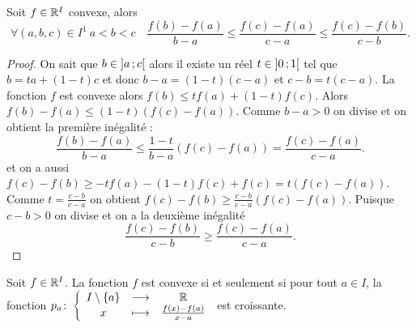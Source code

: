 \begin{theo}\label{theo:pentes}
  Soit \(f \in \mathbb{R}^I\) convexe, alors
  \begin{equation}
    \forall (a,b,c) \in I^1 \ a<b<c \quad \frac{f(b)-f(a)}{b-a} \leqslant 
    \frac{f(c)-f(a)}{c-a} \leqslant \frac{f(c)-f(b)}{c-b}.
  \end{equation}
\end{theo}
\begin{proof}
  On sait que \(b \in \left] a \, ; {} c \right[\) alors il existe un réel \(t \in 
  \left] 0 \, ; {} 1 \right[\) tel que \(b=ta+(1-t)c\) et donc \(b-a=(1-t)(c-a)\) et 
  \(c-b=t(c-a)\). La fonction \(f\) est convexe alors \(f(b) \leqslant 
  tf(a)+(1-t)f(c)\). Alors \(f(b)-f(a) \leqslant (1-t)(f(c)-f(a))\). Comme \(b-a 
  >0\) on divise et on obtient la première inégalité :
  \begin{equation}
    \frac{f(b)-f(a)}{b-a} \leqslant 
    \frac{1-t}{b-a}(f(c)-f(a))=\frac{f(c)-f(a)}{c-a}.
  \end{equation}
  et on a aussi \(f(c)-f(b) \geqslant -tf(a)-(1-t)f(c)+f(c) = t(f(c)-f(a))\). 
  Comme \(t=\frac{c-b}{c-a}\) on obtient \(f(c)-f(b) \geqslant 
  \frac{c-b}{c-a}(f(c)-f(a))\). Puisque \(c-b>0\) on divise et on a la deuxième 
  inégalité
  \begin{equation}
    \frac{f(c)-f(b)}{c-b} \geqslant \frac{f(c)-f(a)}{c-a}.
  \end{equation}
\end{proof}
\begin{theo}
  Soit \(f \in \mathbb{R}^I\). La fonction \(f\) est convexe si et seulement si pour 
  tout \(a \in I\), la fonction 
  \(p_a\colon\left\{\begin{array}{ccc}I\setminus\{a\} & \longrightarrow &\mathbb{R}\\x & \longmapsto & \frac{f(x)-f(a)}{x-a}\end{array}\right.\) est 
  croissante.
\end{theo}
